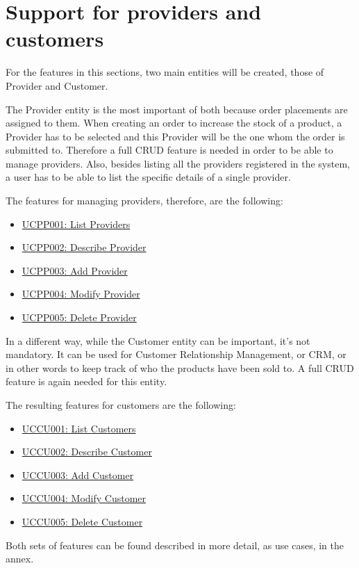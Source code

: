 \section{Support for providers and customers}
For the features in this sections, two main entities will be created, those of Provider and Customer.

The Provider entity is the most important of both because order placements are assigned to them. When creating an order to increase the stock of a product, a Provider has to be selected and this Provider will be the one whom the order is submitted to. Therefore a full CRUD feature is needed in order to be able to manage providers. Also, besides listing all the providers registered in the system, a user has to be able to list the specific details of a single provider.

The features for managing providers, therefore, are the following:
\hfill\break
\begin{itemize}
\item \hyperref[UCPP001]{UCPP001: List Providers}
\item \hyperref[UCPP002]{UCPP002: Describe Provider}
\item \hyperref[UCPP003]{UCPP003: Add Provider}
\item \hyperref[UCPP004]{UCPP004: Modify Provider}
\item \hyperref[UCPP005]{UCPP005: Delete Provider}
\end{itemize}
\hfill\break
In a different way, while the Customer entity can be important, it’s not mandatory. It can be used for Customer Relationship Management, or CRM, or in other words to keep track of who the products have been sold to. A full CRUD feature is again needed for this entity.

The resulting features for customers are the following:
\hfill\break
\begin{itemize}
\item \hyperref[UCCU001]{UCCU001: List Customers}
\item \hyperref[UCCU002]{UCCU002: Describe Customer}
\item \hyperref[UCCU003]{UCCU003: Add Customer}
\item \hyperref[UCCU004]{UCCU004: Modify Customer}
\item \hyperref[UCCU005]{UCCU005: Delete Customer}
\end{itemize}
\hfill\break
Both sets of features can be found described in more detail, as use cases, in the annex.

